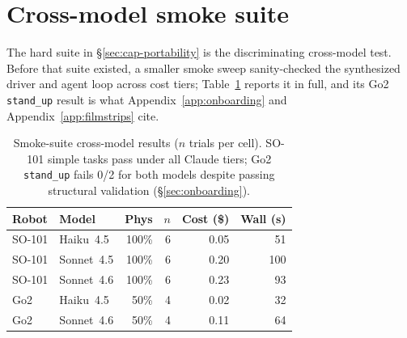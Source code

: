 \section{Cross-model smoke suite}
\label{app:smoke}

The hard suite in \S\ref{sec:cap-portability} is the
discriminating cross-model test. Before that suite existed, a
smaller smoke sweep sanity-checked the synthesized driver and
agent loop across cost tiers; Table~\ref{tab:smoke-cross-model}
reports it in full, and its Go2 \texttt{stand\_up} result is what
Appendix~\ref{app:onboarding} and Appendix~\ref{app:filmstrips}
cite.

\begin{table}[H]
\centering
\small
\setlength{\tabcolsep}{4pt}
\begin{tabular}{llrrrr}
\toprule
\textbf{Robot} & \textbf{Model} & \textbf{Phys}
   & \textbf{$n$} & \textbf{Cost (\$)} & \textbf{Wall (s)} \\
\midrule
SO-101 & Haiku~4.5  & 100\% & 6 & 0.05 &  51 \\
SO-101 & Sonnet~4.5 & 100\% & 6 & 0.20 & 100 \\
SO-101 & Sonnet~4.6 & 100\% & 6 & 0.23 &  93 \\
Go2    & Haiku~4.5  &  50\% & 4 & 0.02 &  32 \\
Go2    & Sonnet~4.6 &  50\% & 4 & 0.11 &  64 \\
\bottomrule
\end{tabular}
\caption{Smoke-suite cross-model results ($n$ trials per cell).
SO-101 simple tasks pass under all Claude tiers; Go2
\texttt{stand\_up} fails 0/2 for both models despite passing
structural validation (\S\ref{sec:onboarding}).}
\label{tab:smoke-cross-model}
\end{table}
